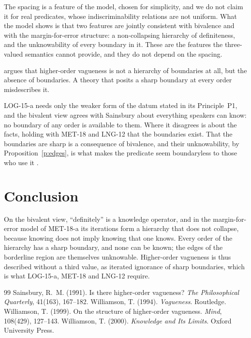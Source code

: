 \documentclass{situationist-preprint}
\begin{document}
\begin{reply}
The spacing is a feature of the model, chosen for simplicity, and we do not claim it for real predicates, whose indiscriminability relations are not uniform. What the model shows is that two features are jointly consistent with bivalence and with the margin-for-error structure: a non-collapsing hierarchy of definiteness, and the unknowability of every boundary in it. These are the features the three-valued semantics cannot provide, and they do not depend on the spacing.
\end{reply}

\begin{objection}[No hierarchy]
\citet{Sainsbury1991} argues that higher-order vagueness is not a hierarchy of boundaries at all, but the absence of boundaries. A theory that posits a sharp boundary at every order misdescribes it.
\end{objection}

\begin{reply}
LOG-15-a needs only the weaker form of the datum stated in its Principle~P1, and the bivalent view agrees with Sainsbury about everything speakers can know: no boundary of any order is available to them. Where it disagrees is about the facts, holding with MET-18 and LNG-12 that the boundaries exist. That the boundaries are sharp is a consequence of bivalence, and their unknowability, by Proposition~\ref{p:edges}, is what makes the predicate seem boundaryless to those who use it \citep{Williamson1999}.
\end{reply}

\section{Conclusion}

On the bivalent view, \enquote{definitely} is a knowledge operator, and in the margin-for-error model of MET-18-a its iterations form a hierarchy that does not collapse, because knowing does not imply knowing that one knows. Every order of the hierarchy has a sharp boundary, and none can be known; the edges of the borderline region are themselves unknowable. Higher-order vagueness is thus described without a third value, as iterated ignorance of sharp boundaries, which is what LOG-15-a, MET-18 and LNG-12 require.

\begin{thebibliography}{99}\small
{} Sainsbury, R.~M. (1991). Is there higher-order vagueness? \emph{The Philosophical Quarterly}, 41(163), 167--182.
 Williamson, T. (1994). \emph{Vagueness}. Routledge.
 Williamson, T. (1999). On the structure of higher-order vagueness. \emph{Mind}, 108(429), 127--143.
 Williamson, T. (2000). \emph{Knowledge and Its Limits}. Oxford University Press.
\end{thebibliography}
\end{document}
